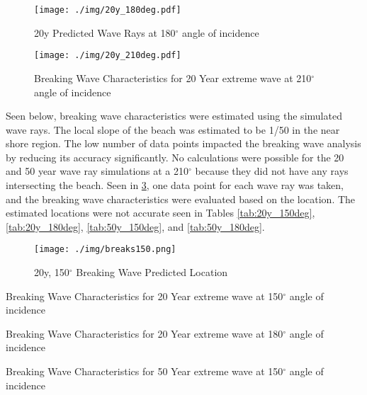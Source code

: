 \begin{figure}[H]
\centering
\texttt{[image: ./img/20y\_180deg.pdf]}
\caption{20y Predicted Wave Rays at 180$^{\circ}$ angle of incidence}
\label{fig:20y180deg}
\end{figure}

\begin{figure}[H]
\centering
\texttt{[image: ./img/20y\_210deg.pdf]}
\caption{Breaking Wave Characteristics for 20 Year extreme wave at 210$^{\circ}$ angle of incidence}
\label{fig:20y210deg}
\end{figure}

Seen below, breaking wave characteristics were estimated using the simulated wave rays. The local slope of the beach was estimated to be 1/50 in the near shore region. The low number of data points impacted the breaking wave analysis by reducing its accuracy significantly. No calculations were possible for the 20 and 50 year wave ray simulations at a 210$^{\circ}$ because they did not have any rays intersecting the beach. Seen in \ref{fig:20y_breaker}, one data point for each wave ray was taken, and the breaking wave characteristics were evaluated based on the location. The estimated locations were not accurate seen in Tables \ref{tab:20y_150deg}, \ref{tab:20y_180deg}, \ref{tab:50y_150deg}, and \ref{tab:50y_180deg}.

\begin{figure}[H]
\centering
\texttt{[image: ./img/breaks150.png]}
\caption{20y, 150$^{\circ}$ Breaking Wave Predicted Location}
\label{fig:20y_breaker}
\end{figure}

\begin{table}[H]
\centering

\caption{Breaking Wave Characteristics for 20 Year extreme wave at 150$^{\circ}$ angle of incidence}
\label{tab:20y_150deg}
\end{table}

\begin{table}[H]
\centering

\caption{Breaking Wave Characteristics for 20 Year extreme wave at 180$^{\circ}$ angle of incidence}
\label{tab:20y_180deg}
\end{table}

\begin{table}[H]
\centering

\caption{Breaking Wave Characteristics for 50 Year extreme wave at 150$^{\circ}$ angle of incidence}
\label{tab:50y_150deg}
\end{table}

